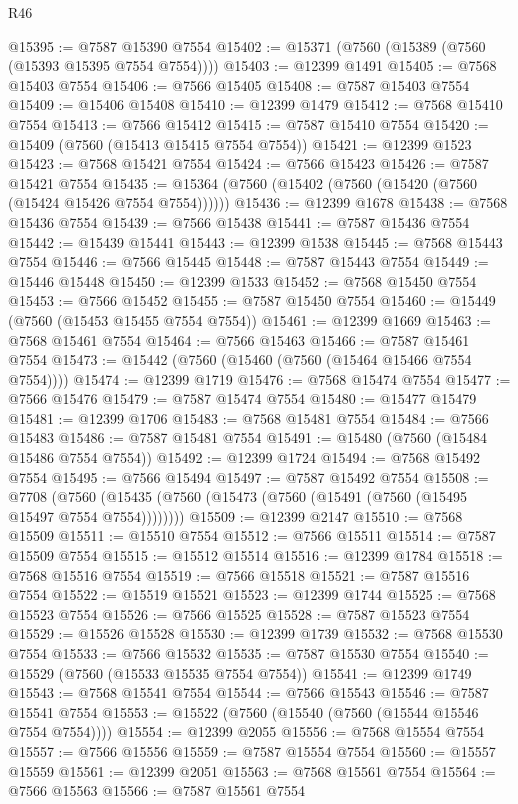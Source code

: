 \begin{lexlean}{R46}
\begin{coremodule}
@15395 := @7587 @15390 @7554
@15402 := @15371 (@7560 (@15389 (@7560 (@15393 @15395 @7554 @7554))))
@15403 := @12399 @1491
@15405 := @7568 @15403 @7554
@15406 := @7566 @15405
@15408 := @7587 @15403 @7554
@15409 := @15406 @15408
@15410 := @12399 @1479
@15412 := @7568 @15410 @7554
@15413 := @7566 @15412
@15415 := @7587 @15410 @7554
@15420 := @15409 (@7560 (@15413 @15415 @7554 @7554))
@15421 := @12399 @1523
@15423 := @7568 @15421 @7554
@15424 := @7566 @15423
@15426 := @7587 @15421 @7554
@15435 := @15364 (@7560 (@15402 (@7560 (@15420 (@7560 (@15424 @15426 @7554 @7554))))))
@15436 := @12399 @1678
@15438 := @7568 @15436 @7554
@15439 := @7566 @15438
@15441 := @7587 @15436 @7554
@15442 := @15439 @15441
@15443 := @12399 @1538
@15445 := @7568 @15443 @7554
@15446 := @7566 @15445
@15448 := @7587 @15443 @7554
@15449 := @15446 @15448
@15450 := @12399 @1533
@15452 := @7568 @15450 @7554
@15453 := @7566 @15452
@15455 := @7587 @15450 @7554
@15460 := @15449 (@7560 (@15453 @15455 @7554 @7554))
@15461 := @12399 @1669
@15463 := @7568 @15461 @7554
@15464 := @7566 @15463
@15466 := @7587 @15461 @7554
@15473 := @15442 (@7560 (@15460 (@7560 (@15464 @15466 @7554 @7554))))
@15474 := @12399 @1719
@15476 := @7568 @15474 @7554
@15477 := @7566 @15476
@15479 := @7587 @15474 @7554
@15480 := @15477 @15479
@15481 := @12399 @1706
@15483 := @7568 @15481 @7554
@15484 := @7566 @15483
@15486 := @7587 @15481 @7554
@15491 := @15480 (@7560 (@15484 @15486 @7554 @7554))
@15492 := @12399 @1724
@15494 := @7568 @15492 @7554
@15495 := @7566 @15494
@15497 := @7587 @15492 @7554
@15508 := @7708
    (@7560 (@15435 (@7560 (@15473 (@7560 (@15491 (@7560 (@15495 @15497 @7554 @7554))))))))
@15509 := @12399 @2147
@15510 := @7568 @15509
@15511 := @15510 @7554
@15512 := @7566 @15511
@15514 := @7587 @15509 @7554
@15515 := @15512 @15514
@15516 := @12399 @1784
@15518 := @7568 @15516 @7554
@15519 := @7566 @15518
@15521 := @7587 @15516 @7554
@15522 := @15519 @15521
@15523 := @12399 @1744
@15525 := @7568 @15523 @7554
@15526 := @7566 @15525
@15528 := @7587 @15523 @7554
@15529 := @15526 @15528
@15530 := @12399 @1739
@15532 := @7568 @15530 @7554
@15533 := @7566 @15532
@15535 := @7587 @15530 @7554
@15540 := @15529 (@7560 (@15533 @15535 @7554 @7554))
@15541 := @12399 @1749
@15543 := @7568 @15541 @7554
@15544 := @7566 @15543
@15546 := @7587 @15541 @7554
@15553 := @15522 (@7560 (@15540 (@7560 (@15544 @15546 @7554 @7554))))
@15554 := @12399 @2055
@15556 := @7568 @15554 @7554
@15557 := @7566 @15556
@15559 := @7587 @15554 @7554
@15560 := @15557 @15559
@15561 := @12399 @2051
@15563 := @7568 @15561 @7554
@15564 := @7566 @15563
@15566 := @7587 @15561 @7554

\end{coremodule}
\end{lexlean}
